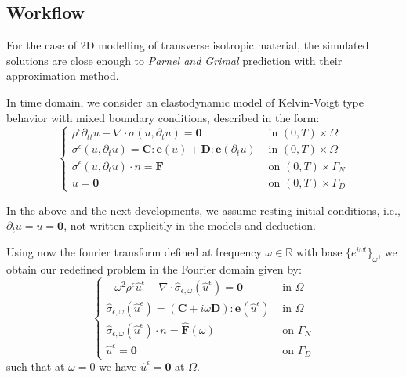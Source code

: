 \subsection{Workflow}
\begin{rem}
For the case of 2D modelling of transverse isotropic material, the simulated solutions are close enough to \textit{Parnel and Grimal} prediction with their approximation method.
\end{rem}
In time domain, we consider an elastodynamic model of Kelvin-Voigt type behavior with mixed boundary conditions, described in the form:
\begin{equation*}
    \left \{
    \begin{array}{cc}
        \rho^{\epsilon}\partial_{tt}u - \nabla \cdot \sigma(u, \partial_t u) = \mathbf{0} & \text{ in } (0,T)\times \Omega \\
        \sigma^{\epsilon}(u,\partial_t u)  = \mathbf{C}:\mathbf{e}(u) + \mathbf{D}:\mathbf{e}(\partial_t u) & \text{ in } (0,T)\times\Omega \\
        \sigma^{\epsilon}(u, \partial_t u)\cdot n = \mathbf{F} & \text{ on }(0,T)\times \Gamma_N \\ 
        u = \mathbf{0} & \text{ on } (0,T)\times \Gamma_D
    \end{array}
    \right .
\end{equation*}
\begin{rem}
In the above and the next developments, we assume resting initial conditions, i.e., $\partial_t u = u = \mathbf{0}$, not written explicitly in the models and deduction.
\end{rem}
Using now the fourier transform defined at frequency $\omega \in \mathbb{R}$ with base $\{e^{i\omega t}\}_{\omega}$, we obtain our redefined problem in the Fourier domain given by:
\begin{equation*}
    \left \{
    \begin{array}{cc}
        -\omega^2 \rho^{\epsilon} \hat{u}^{\epsilon} - \nabla \cdot \hat{\sigma}_{\epsilon,\omega}(\hat{u}^{\epsilon}) = \mathbf{0} & \text{ in } \Omega  \\
        \hat{\sigma}_{\epsilon,\omega} (\hat{u}^{\epsilon}) = (\mathbf{C} + i\omega \mathbf{D}):\mathbf{e}(\hat{u}^{\epsilon}) & \text{ in } \Omega \\
        \hat{\sigma}_{\epsilon,\omega} (\hat{u}^{\epsilon}) \cdot n = \hat{\mathbf{F}}(\omega) & \text{ on } \Gamma_N \\
        \hat{u}^{\epsilon} = \mathbf{0} & \text{ on } \Gamma_D
    \end{array}
    \right .
\end{equation*}
such that at $\omega = 0$ we have $\hat{u}^{\epsilon}=\mathbf{0}$ at $\Omega$.\\

